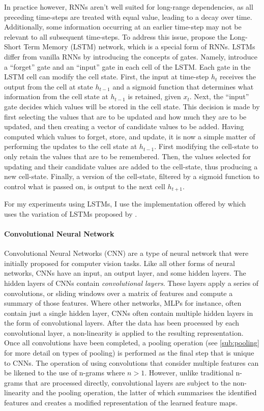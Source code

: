 In practice however, RNNs aren't well suited for long-range dependencies, as all preceding time-steps are treated with equal value, leading to a decay over time.
Additionally, some information occurring at an earlier time-step may not be relevant to all subsequent time-steps.
To address this issue, \citet{Hochreiter:1997} propose the Long-Short Term Memory (LSTM) network, which is a special form of RNNs.
LSTMs differ from vanilla RNNs by introducing the concepts of gates. 
Namely, \citet{Hochreiter:1997} introduce a ``forget'' gate and an ``input'' gate in each cell of the LSTM. 
Each gate in the LSTM cell can modify the cell state.
First, the input at time-step $h_t$ receives the output from the cell at state $h_{t-1}$ and a sigmoid function that determines what information from the cell state at $h_{t-1}$ is retained, given $x_t$.
Next, the ``input'' gate decides which values will be stored in the cell state. 
This decision is made by first selecting the values that are to be updated and how much they are to be updated, and then creating a vector of candidate values to be added.
Having computed which values to forget, store, and update, it is now a simple matter of performing the updates to the cell state at $h_{t-1}$. 
First modifying the cell-state to only retain the values that are to be remembered. 
Then, the values selected for updating and their candidate values are added to the cell-state, thus producing a new cell-state.
Finally, a version of the cell-state, filtered by a sigmoid function to control what is passed on, is output to the next cell $h_{t+1}$.

For my experiments using LSTMs, I use the implementation offered by \citet{Paszke:2019} which uses the variation of LSTMs proposed by \citet{Sak:2014}.

\paragraph{Convolutional Neural Network}
Convolutional Neural Networks (CNN) are a type of neural network that were initially proposed for computer vision tasks.
Like all other forms of neural networks, CNNs have an input, an output layer, and some hidden layers.
The hidden layers of CNNs contain \textit{convolutional layers}. 
These layers apply a series of convolutions, or sliding windows over a matrix of features and compute a summary of those features.
Where other networks, MLPs for instance, often contain just a single hidden layer, CNNs often contain multiple hidden layers in the form of convolutional layers.
After the data has been processed by each convolutional layer, a non-linearity is applied to the resulting representation.
Once all convolutions have been completed, a pooling operation (see \cref{sub:pooling} for more detail on types of pooling) is performed as the final step that is unique to CNNs.
The operation of using convolutions that consider multiple features can be likened to the use of n-grams where $n>1$. 
However, unlike traditional n-grams that are processed directly, convolutional layers are subject to the non-linearity and the pooling operation, the latter of which summarises the identified features and creates a modified representation of the learned feature maps.

